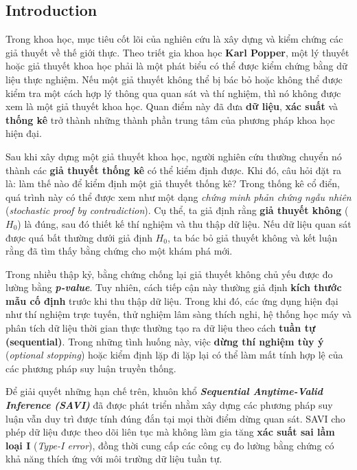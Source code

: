 \subsection{Introduction}

Trong khoa học, mục tiêu cốt lõi của nghiên cứu là xây dựng và kiểm chứng các giả thuyết về thế giới thực. Theo triết gia khoa học \textbf{Karl Popper}, một lý thuyết hoặc giả thuyết khoa học phải là một phát biểu có thể được kiểm chứng bằng dữ liệu thực nghiệm. Nếu một giả thuyết không thể bị bác bỏ hoặc không thể được kiểm tra một cách hợp lý thông qua quan sát và thí nghiệm, thì nó không được xem là một giả thuyết khoa học. Quan điểm này đã đưa \textbf{dữ liệu}, \textbf{xác suất} và \textbf{thống kê} trở thành những thành phần trung tâm của phương pháp khoa học hiện đại.

Sau khi xây dựng một giả thuyết khoa học, người nghiên cứu thường chuyển nó thành các \textbf{giả thuyết thống kê} có thể kiểm định được. Khi đó, câu hỏi đặt ra là: làm thế nào để kiểm định một giả thuyết thống kê? Trong thống kê cổ điển, quá trình này có thể được xem như một dạng \textit{chứng minh phản chứng ngẫu nhiên} (\textit{stochastic proof by contradiction}). Cụ thể, ta giả định rằng \textbf{giả thuyết không} ($H_0$) là đúng, sau đó thiết kế thí nghiệm và thu thập dữ liệu. Nếu dữ liệu quan sát được quá bất thường dưới giả định $H_0$, ta bác bỏ giả thuyết không và kết luận rằng đã tìm thấy bằng chứng cho một khám phá mới.

Trong nhiều thập kỷ, bằng chứng chống lại giả thuyết không chủ yếu được đo lường bằng \textbf{\textit{p-value}}. Tuy nhiên, cách tiếp cận này thường giả định \textbf{kích thước mẫu cố định} trước khi thu thập dữ liệu. Trong khi đó, các ứng dụng hiện đại như thí nghiệm trực tuyến, thử nghiệm lâm sàng thích nghi, hệ thống học máy và phân tích dữ liệu thời gian thực thường tạo ra dữ liệu theo cách \textbf{tuần tự (sequential)}. Trong những tình huống này, việc \textbf{dừng thí nghiệm tùy ý} (\textit{optional stopping}) hoặc kiểm định lặp đi lặp lại có thể làm mất tính hợp lệ của các phương pháp suy luận truyền thống.

Để giải quyết những hạn chế trên, khuôn khổ \textbf{\textit{Sequential Anytime-Valid Inference (SAVI)}} đã được phát triển nhằm xây dựng các phương pháp suy luận vẫn duy trì được tính đúng đắn tại mọi thời điểm dừng quan sát. SAVI cho phép dữ liệu được theo dõi liên tục mà không làm gia tăng \textbf{xác suất sai lầm loại I} (\textit{Type-I error}), đồng thời cung cấp các công cụ đo lường bằng chứng có khả năng thích ứng với môi trường dữ liệu tuần tự.

